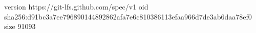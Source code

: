 version https://git-lfs.github.com/spec/v1
oid sha256:d91bc3a7ee796890144892862afa7e6c810386113efaa966d7de3ab6daa78ef0
size 91093
